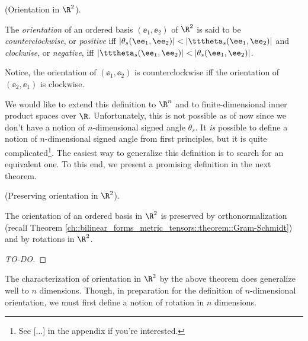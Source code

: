 \begin{defn}
    (Orientation in $\R^2$).
    
    The \textit{orientation} of an ordered basis $(\ee_1, \ee_2)$ of $\R^2$ is said to be \textit{counterclockwise}, or \textit{positive} iff $|\theta_s(\ee_1, \ee_2)| < |\tttheta_s(\ee_1, \ee_2)|$ and \textit{clockwise}, or \textit{negative}, iff $|\tttheta_s(\ee_1, \ee_2)| < |\theta_s(\ee_1, \ee_2)|$.

    Notice, the orientation of $(\ee_1, \ee_2)$ is counterclockwise iff the orientation of $(\ee_2, \ee_1)$ is clockwise.
\end{defn}

We would like to extend this definition to $\R^n$ and to finite-dimensional inner product spaces over $\R$. Unfortunately, this is not possible as of now since we don't have a notion of $n$-dimensional signed angle $\theta_s$. It \textit{is} possible to define a notion of $n$-dimensional signed angle from first principles, but it is quite complicated\footnote{See [...] in the appendix if you're interested.}. The easiest way to generalize this definition is to search for an equivalent one. To this end, we present a promising definition in the next theorem.

\begin{theorem}
    (Preserving orientation in $\R^2$).

    The orientation of an ordered basis in $\R^2$ is preserved by orthonormalization (recall Theorem \ref{ch::bilinear_forms_metric_tensors::theorem::Gram-Schmidt}) and by rotations in $\R^2$.
\end{theorem}

\begin{proof}
    [TO-DO]
\end{proof}

The characterization of orientation in $\R^2$ by the above theorem does generalize well to $n$ dimensions. Though, in preparation for the definition of $n$-dimensional orientation, we must first define a notion of rotation in $n$ dimensions.

